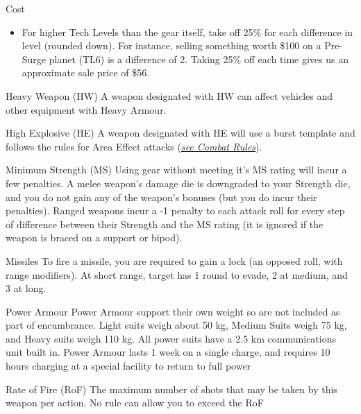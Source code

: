 \begin{multicols}{2}
\begin{genericsection}{Cost}
\begin{itemize}
  \item For higher Tech Levels than the gear itself, take off 25\% for each difference in level (rounded down). For instance, selling something worth \$100 on a Pre-Surge planet (TL6) is a difference of 2. Taking 25\% off each time gives us an approximate sale price of \$56.
\end{itemize}
\end{genericsection}

\begin{genericsection}{Heavy Weapon (HW)}
A weapon designated with HW can affect vehicles and other equipment with Heavy Armour.
\end{genericsection}

\begin{genericsection}{High Explosive (HE)}
A weapon designated with HE will use a burst template and follows the rules for Area Effect attacks (\textit{\hyperref[sec:rules-combat]{see Combat Rules}}).
\end{genericsection}

\begin{genericsection}{Minimum Strength (MS)}
Using gear without meeting it's MS rating will incur a few penalties. A melee weapon's damage die is downgraded to your Strength die, and you do not gain any of the weapon's bonuses (but you do incur their penalties). Ranged weapons incur a -1 penalty to each attack roll for every step of difference between their Strength and the MS rating (it is ignored if the weapon is braced on a support or bipod).
\end{genericsection}

\begin{genericsection}{Missiles}
To fire a missile, you are required to gain a lock (an opposed roll, with range modifiers). At short range, target has 1 round to evade, 2 at medium, and 3 at long.
\end{genericsection}

\begin{genericsection}{Power Armour}
Power Armour support their own weight so are not included as part of encumbrance. Light suits weigh about 50 kg, Medium Suits weigh 75 kg, and Heavy suits weigh 110 kg. All power suits have a 2.5 km communications unit built in. Power Armour lasts 1 week on a single charge, and requires 10 hours charging at a special facility to return to full power
\end{genericsection}

\begin{genericsection}{Rate of Fire (RoF)}
The maximum number of shots that may be taken by this weapon per action. No rule can allow you to exceed the RoF
\end{genericsection}


\end{multicols}
